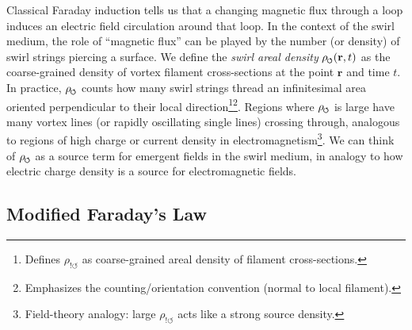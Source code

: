 \documentclass[12pt]{article}
\DeclareRobustCommand{\swirlarrow}{
\mathchoice{\mkern-2mu\scriptstyle\boldsymbol{\circlearrowleft}}%
{\mkern-2mu\scriptstyle\boldsymbol{\circlearrowleft}}%
{\mkern-2mu\scriptscriptstyle\boldsymbol{\circlearrowleft}}%
{\mkern-2mu\scriptscriptstyle\boldsymbol{\circlearrowleft}}
}%
\begin{document}
Classical Faraday induction tells us that a changing magnetic flux through a loop induces an electric field circulation around that loop. In the context of the swirl medium, the role of ``magnetic flux'' can be played by the number (or density) of swirl strings piercing a surface. We define the \emph{swirl areal density} $\rho_{\swirlarrow}(\mathbf{r},t)$ as the coarse-grained density of vortex filament cross-sections at the point $\mathbf{r}$ and time $t$. In practice, $\rho_{\swirlarrow}$ counts how many swirl strings thread an infinitesimal area oriented perpendicular to their local direction\footnote{Defines $\rho_{!\circlearrowleft}$ as coarse-grained areal density of filament cross-sections.}\footnote{Emphasizes the counting/orientation convention (normal to local filament).}. Regions where $\rho_{\swirlarrow}$ is large have many vortex lines (or rapidly oscillating single lines) crossing through, analogous to regions of high charge or current density in electromagnetism\footnote{Field-theory analogy: large $\rho_{!\circlearrowleft}$ acts like a strong source density.}. We can think of $\rho_{\swirlarrow}$ as a source term for emergent fields in the swirl medium, in analogy to how electric charge density is a source for electromagnetic fields.




\subsection*{Modified Faraday's Law}
\end{document}
